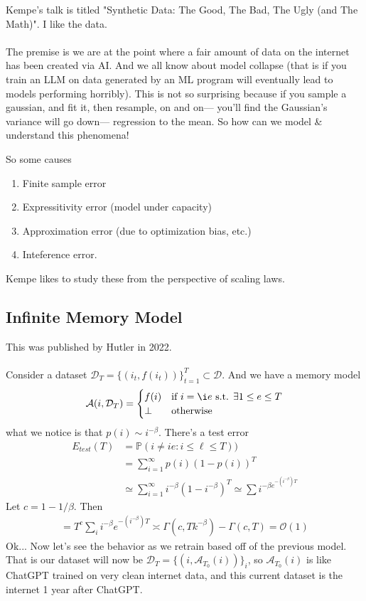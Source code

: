 Kempe's talk is titled "Synthetic Data: The Good, The Bad, The Ugly (and The Math)". I like the data.\\
\\
The premise is we are at the point where a fair amount of data on the internet has been created via AI. And we all know about model collapse (that is if you train an LLM on data generated by an ML program will eventually lead to models performing horribly). This is not so surprising because if you sample a gaussian, and fit it, then resample, on and on--- you'll find the Gaussian's variance will go down--- regression to the mean. So how can we model \& understand this phenomena!

So some causes
\begin{enumerate}
	\item Finite sample error
	\item Expressitivity error (model under capacity)
	\item Approximation error (due to optimization bias, etc.)
	\item Inteference error.
\end{enumerate}
Kempe likes to study these from the perspective of scaling laws.
\subsection{Infinite Memory Model}
This was published by Hutler in 2022.\\
\\
Consider a dataset $\mathcal D_T = \{(i_t, f(i_t))\}_{t=1}^T \subset \mathcal D$. And we have a memory model
\begin{align}
	\mathcal A(i, \mathcal D_T) = \begin{cases}
		f(i)  &  \text{if } i = \i e \text{ s.t. } \exists 1 \leq e \leq T\\
		\perp &  \text{otherwise}
	\end{cases}
\end{align}
what we notice is that $p(i) \sim i^{-\beta}$. 
There's a test error 
\begin{align}
	E_{test}(T)&  = \mathbb P(i \neq ie : i \leq \ell \leq T)) \\
	& = \sum_{i=1}^\infty p(i) (1 - p(i))^T\\
	& \simeq \sum_{i=1}^\infty i^{-\beta  } (1- i^{-\beta})^T \simeq \sum i^{-\beta e^{-(i^{-\beta})T}}
\end{align}
Let $c = 1 -1/\beta$. Then
\begin{align}
	= T^c \sum_{i} i^{-\beta} e^{-(i^{-\beta}) T}  \asymp  \Gamma(c, T k^{-\beta}) - \Gamma (c, T) = \mathcal O(1)
\end{align}
Ok... Now let's see the behavior as we retrain based off of the previous model. That is our dataset will now be $\mathcal D_T = \{(i, \mathcal A_{T_0}(i))\}_{i}$, so $\mathcal A_{T_0}(i)$ is like ChatGPT trained on very clean internet data, and this current dataset is the internet 1 year after ChatGPT.

